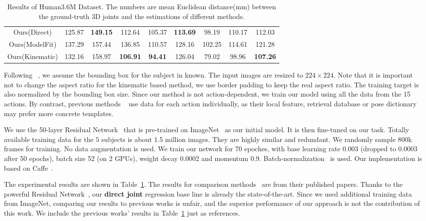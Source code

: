 \documentclass[runningheads]{llncs}
\begin{document}
\begin{table}
\begin{center}
\begin{tabular}{ccccccccc}
Ours(Direct) & 125.87 & \bf 149.15 & 112.64 & 105.37 & \bf 113.69 & 98.19 & 110.17 & 112.03 \\
Ours(ModelFit) & 137.29 & 157.44 & 136.85 & 110.57 & 128.16 & 102.25 & 114.61 & 121.28 \\
Ours(Kinematic) & 132.16 & 158.97 & \bf 106.91 & \bf 94.41 & 126.04 & 79.02 & 98.96 & \bf 107.26 \\
\hline
\end{tabular}
\caption{Results of Human3.6M Dataset. The numbers are mean Euclidean distance(mm) between the ground-truth 3D joints and the estimations of different methods.}
\label{table:H36M}
\end{center}
\end{table}
\setlength{\tabcolsep}{1.4pt}

Following ~\cite{li20143d,tekin2016structured}, we assume the bounding box for the subject in known. The input images are resized to $224 \times 224$. Note that it is important not to change the aspect ratio for the kinematic based method, we use border padding to keep the real aspect ratio. The training target is also normalized by the bounding box size. Since our method is not action-dependent, we train our model using all the data from the 15 actions. By contrast, previous methods ~\cite{h36m_pami,Li_2015_ICCV,Zhou_2016_CVPR} use data for each action individually, as their local feature, retrieval database or pose dictionary may prefer more concrete templates.

We use the 50-layer Residual Network~\cite{He_2016_CVPR} that is pre-trained on ImageNet~\cite{DBLP:journals/corr/RussakovskyDSKSMHKKBBF14} as our initial model. It is then fine-tuned on our task. Totally available training data for the $5$ subjects is about 1.5 million images. They are highly similar and redundant. We randomly sample 800k frames for training. No data augmentation is used. We train our network for 70 epoches, with base learning rate 0.003 (dropped to 0.0003 after 50 epochs), batch size 52 (on 2 GPUs), weight decay 0.0002 and momentum 0.9. Batch-normalization~\cite{ioffe2015batch} is used. Our implementation is based on Caffe~\cite{jia2014caffe}.

The experimental results are shown in Table~\ref{table:H36M}. The results for comparison methods~\cite{h36m_pami,li20143d,Li_2015_ICCV,tekin2016structured,tekin2016structured,Tekin_2016_CVPR,Zhou_2016_CVPR} are from their published papers. Thanks to the powerful Residual Network~\cite{He_2016_CVPR}, our \textbf{direct joint} regression base line is already the state-of-the-art. Since we used additional training data from ImageNet, comparing our results to previous works is unfair, and the superior performance of our approach is not the contribution of this work. We include the previous works' results in Table~\ref{table:H36M} just as references.
\end{document}
